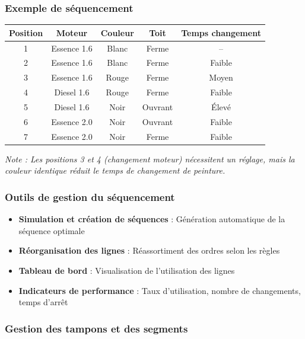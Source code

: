 \documentclass{article}
\begin{document}
\subsubsection{Exemple de séquencement}

\begin{tcolorbox}[colback=vertclair, colframe=green!50!black, title=Exemple : Séquencement d'une ligne d'assemblage automobile]
\begin{table}[h]
\centering
\begin{tabular}{|c|c|c|c|c|}
\hline
\textbf{Position} & \textbf{Moteur} & \textbf{Couleur} & \textbf{Toit} & \textbf{Temps changement} \\
\hline
1 & Essence 1.6 & Blanc & Ferme & -- \\
2 & Essence 1.6 & Blanc & Ferme & Faible \\
3 & Essence 1.6 & Rouge & Ferme & Moyen \\
4 & Diesel 1.6 & Rouge & Ferme & Faible \\
5 & Diesel 1.6 & Noir & Ouvrant & Élevé \\
6 & Essence 2.0 & Noir & Ouvrant & Faible \\
7 & Essence 2.0 & Noir & Ferme & Faible \\
\hline
\end{tabular}
\end{table}
\textit{Note : Les positions 3 et 4 (changement moteur) nécessitent un réglage, mais la couleur identique réduit le temps de changement de peinture.}
\end{tcolorbox}

\subsubsection{Outils de gestion du séquencement}

\begin{itemize}
    \item \textbf{Simulation et création de séquences} : Génération automatique de la séquence optimale
    \item \textbf{Réorganisation des lignes} : Réassortiment des ordres selon les règles
    \item \textbf{Tableau de bord} : Visualisation de l'utilisation des lignes
    \item \textbf{Indicateurs de performance} : Taux d'utilisation, nombre de changements, temps d'arrêt
\end{itemize}

\subsubsection{Gestion des tampons et des segments}
\end{document}
